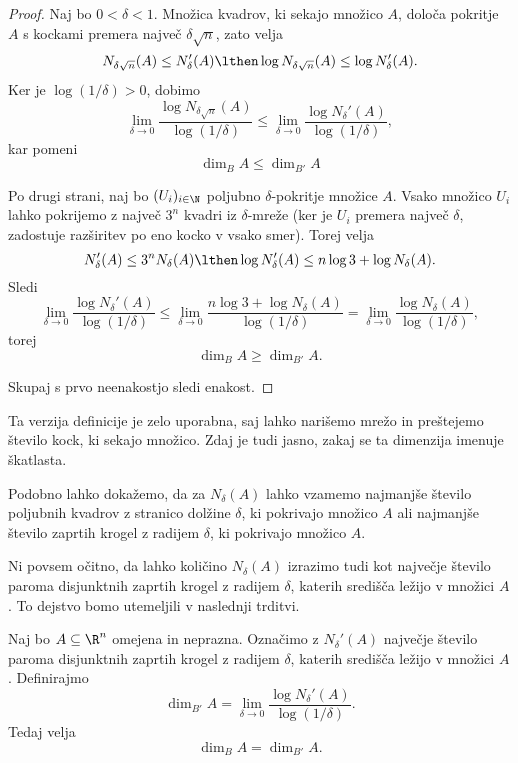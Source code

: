 \begin{proof}
    Naj bo \(0 < \delta < 1\). Množica kvadrov, ki sekajo množico \(A\), določa pokritje \(A\) s kockami premera največ \(\delta \sqrt{n}\), zato velja
    \[N_{\delta\sqrt{n}}(A) \leq N_\delta'(A) \lthen \log N_{\delta\sqrt{n}}(A) \leq \log N_\delta'(A).\]
    Ker je \(\log(1/\delta) > 0\), dobimo
    \[
        \lim_{\delta \to 0} \frac{\log N_{\delta\sqrt{n}}(A)}{\log(1/\delta)} \leq \lim_{\delta \to 0} \frac{\log N_\delta'(A)}{\log(1/\delta)},
    \]
    kar pomeni
    \[\dim_B A \leq \dim_{B'} A\]

    Po drugi strani, naj bo \((U_i)_{i \in \N}\) poljubno \(\delta\)-pokritje množice \(A\). Vsako množico \(U_i\) lahko pokrijemo z največ \(3^n\) kvadri iz \(\delta\)-mreže (ker je \(U_i\) premera največ \(\delta\), zadostuje razširitev po eno kocko v vsako smer). Torej velja
    \[
    N_\delta'(A) \leq 3^n N_\delta (A) \lthen \log N_\delta'(A) \leq n \log 3 + \log N_\delta (A).
    \]
    Sledi
    \[
        \lim_{\delta \to 0} \frac{\log N_\delta'(A)}{\log(1/\delta)} \leq \lim_{\delta \to 0} \frac{n \log 3 + \log N_\delta (A)}{\log(1/\delta)} = \lim_{\delta \to 0} \frac{\log N_\delta (A)}{\log(1/\delta)},
    \]
    torej
    \[\dim_B A \geq \dim_{B'} A.\]

    Skupaj s prvo neenakostjo sledi enakost.
\end{proof}

Ta verzija definicije je zelo uporabna, saj lahko narišemo mrežo in preštejemo število kock, ki sekajo množico. Zdaj je tudi jasno, zakaj se ta dimenzija imenuje škatlasta.

Podobno lahko dokažemo, da za \(N_\delta(A)\) lahko vzamemo najmanjše število poljubnih kvadrov z stranico dolžine \(\delta\), ki pokrivajo množico \(A\) ali najmanjše število zaprtih krogel z radijem \(\delta\), ki pokrivajo množico \(A\).

Ni povsem očitno, da lahko količino \(N_\delta(A)\) izrazimo tudi kot največje število paroma disjunktnih zaprtih krogel z radijem \(\delta\), katerih središča ležijo v množici \(A\). To dejstvo bomo utemeljili v naslednji trditvi.

\begin{trditev}
    Naj bo \(A \subseteq \R^n\) omejena in neprazna. Označimo z \(N_\delta'(A)\) največje število paroma disjunktnih zaprtih krogel z radijem \(\delta\), katerih središča ležijo v množici \(A\). Definirajmo
    \[
    \dim_{B'} A = \lim_{\delta \to 0} \frac{\log N_\delta'(A)}{\log(1/\delta)}.
    \]
    Tedaj velja
    \[
    \dim_B A = \dim_{B'} A.
    \] 
\end{trditev}

